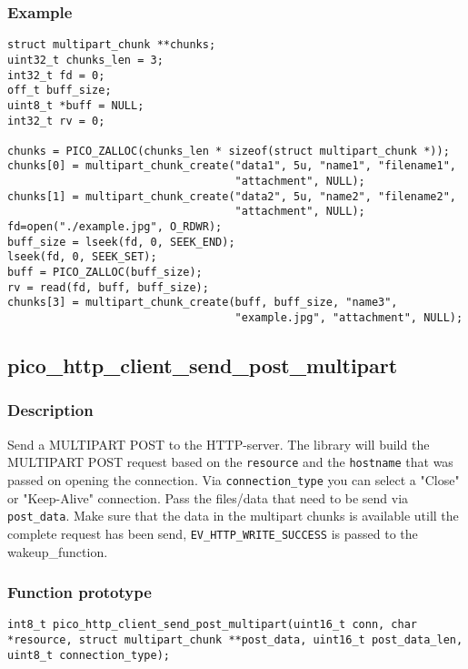 \subsubsection*{Example}
\begin{verbatim}
struct multipart_chunk **chunks;
uint32_t chunks_len = 3;
int32_t fd = 0;
off_t buff_size;
uint8_t *buff = NULL;
int32_t rv = 0;

chunks = PICO_ZALLOC(chunks_len * sizeof(struct multipart_chunk *));
chunks[0] = multipart_chunk_create("data1", 5u, "name1", "filename1",
                                   "attachment", NULL);
chunks[1] = multipart_chunk_create("data2", 5u, "name2", "filename2",
                                   "attachment", NULL);
fd=open("./example.jpg", O_RDWR);
buff_size = lseek(fd, 0, SEEK_END);
lseek(fd, 0, SEEK_SET);
buff = PICO_ZALLOC(buff_size);
rv = read(fd, buff, buff_size);
chunks[3] = multipart_chunk_create(buff, buff_size, "name3",
                                   "example.jpg", "attachment", NULL);
\end{verbatim}



\subsection{pico\_http\_client\_send\_post\_multipart}

\subsubsection*{Description}
Send a MULTIPART POST to the HTTP-server. The library will build the MULTIPART POST request based on the \texttt{resource} and the \texttt{hostname} that was passed on opening the connection. Via \texttt{connection\_type} you can select a "Close" or "Keep-Alive" connection. Pass the files/data that need to be send via \texttt{post\_data}. Make sure that the data in the multipart chunks is available utill the complete request has been send, \texttt{EV\_HTTP\_WRITE\_SUCCESS} is passed to the wakeup\_function.

\subsubsection*{Function prototype}
\texttt{int8\_t pico\_http\_client\_send\_post\_multipart(uint16\_t conn, char *resource, struct multipart\_chunk **post\_data, uint16\_t post\_data\_len, uint8\_t connection\_type);}

